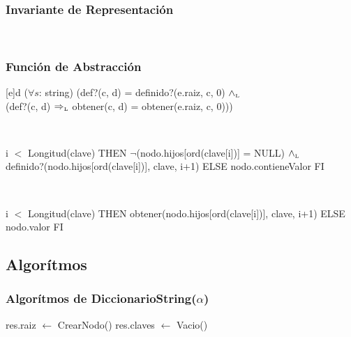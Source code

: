 \subsubsection{Invariante de Representación}


~


\tadAxioma{hijoValido(nodo)}{
	nodo == NULL $\oluego$ ($\forall i \in [0..256)$) (hijoValido(nodo.hijos[i]))
}

\subsubsection{Función de Abstracción}

\Abs[dicStr]{\dicString}[e]{d}
{($\forall s$: string)
(def?(c, d) = definido?(e.raiz, c, 0) $\land_{\mathrm{\scriptscriptstyle{L}}}$ \\
(def?(c, d) $\Rightarrow_{\mathrm{\scriptscriptstyle{L}}}$ obtener(c, d) = obtener(e.raiz, c, 0)))
}

~

{\IF i $<$ Longitud(clave) THEN
	$\neg$(nodo.hijos[ord(clave[i])] = NULL) $\land_{\mathrm{\scriptscriptstyle{L}}}$ \\ definido?(nodo.hijos[ord(clave[i])], clave, i+1)
ELSE
	nodo.contieneValor
FI}


~


{\IF i $<$ Longitud(clave) THEN
	obtener(nodo.hijos[ord(clave[i])], clave, i+1)
ELSE
	nodo.valor
FI}

\subsection{Algorítmos}

\subsubsection{Algorítmos de DiccionarioString(\texorpdfstring{$\alpha$}{α})}

\begin{algorithm}[H]
	\NoCaptionOfAlgo
	\caption{}
	res.raiz $\leftarrow$ CrearNodo() 
	res.claves $\leftarrow$ Vacio() 
\end{algorithm}

